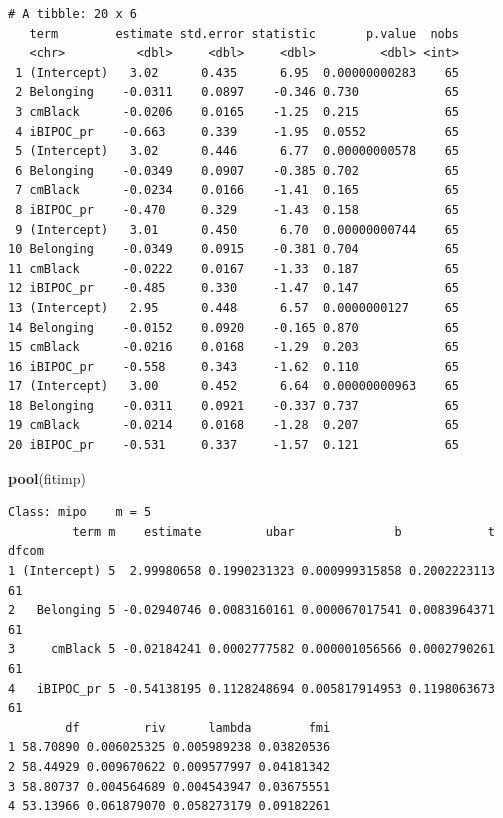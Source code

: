 \documentclass[
  11pt,
]{book}
\newenvironment{Shaded}{\begin{snugshade}}{\end{snugshade}}
\newcommand{\FunctionTok}[1]{\textcolor[rgb]{0.27,0.27,0.27}{\textbf{#1}}}
\newcommand{\NormalTok}[1]{#1}
\begin{document}
\begin{verbatim}
# A tibble: 20 x 6
   term        estimate std.error statistic       p.value  nobs
   <chr>          <dbl>     <dbl>     <dbl>         <dbl> <int>
 1 (Intercept)   3.02      0.435      6.95  0.00000000283    65
 2 Belonging    -0.0311    0.0897    -0.346 0.730            65
 3 cmBlack      -0.0206    0.0165    -1.25  0.215            65
 4 iBIPOC_pr    -0.663     0.339     -1.95  0.0552           65
 5 (Intercept)   3.02      0.446      6.77  0.00000000578    65
 6 Belonging    -0.0349    0.0907    -0.385 0.702            65
 7 cmBlack      -0.0234    0.0166    -1.41  0.165            65
 8 iBIPOC_pr    -0.470     0.329     -1.43  0.158            65
 9 (Intercept)   3.01      0.450      6.70  0.00000000744    65
10 Belonging    -0.0349    0.0915    -0.381 0.704            65
11 cmBlack      -0.0222    0.0167    -1.33  0.187            65
12 iBIPOC_pr    -0.485     0.330     -1.47  0.147            65
13 (Intercept)   2.95      0.448      6.57  0.0000000127     65
14 Belonging    -0.0152    0.0920    -0.165 0.870            65
15 cmBlack      -0.0216    0.0168    -1.29  0.203            65
16 iBIPOC_pr    -0.558     0.343     -1.62  0.110            65
17 (Intercept)   3.00      0.452      6.64  0.00000000963    65
18 Belonging    -0.0311    0.0921    -0.337 0.737            65
19 cmBlack      -0.0214    0.0168    -1.28  0.207            65
20 iBIPOC_pr    -0.531     0.337     -1.57  0.121            65
\end{verbatim}

\begin{Shaded}
\begin{Highlighting}[]
\FunctionTok{pool}\NormalTok{(fitimp)}
\end{Highlighting}
\end{Shaded}

\begin{verbatim}
Class: mipo    m = 5 
         term m    estimate         ubar              b            t dfcom
1 (Intercept) 5  2.99980658 0.1990231323 0.000999315858 0.2002223113    61
2   Belonging 5 -0.02940746 0.0083160161 0.000067017541 0.0083964371    61
3     cmBlack 5 -0.02184241 0.0002777582 0.000001056566 0.0002790261    61
4   iBIPOC_pr 5 -0.54138195 0.1128248694 0.005817914953 0.1198063673    61
        df         riv      lambda        fmi
1 58.70890 0.006025325 0.005989238 0.03820536
2 58.44929 0.009670622 0.009577997 0.04181342
3 58.80737 0.004564689 0.004543947 0.03675551
4 53.13966 0.061879070 0.058273179 0.09182261
\end{verbatim}
\end{document}
